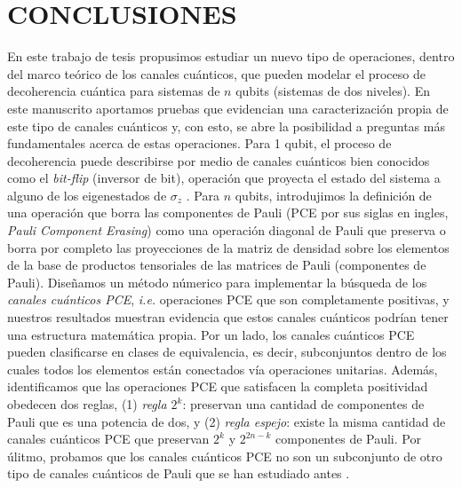 

\chapter{CONCLUSIONES}
En este trabajo de tesis propusimos estudiar un nuevo tipo de operaciones, dentro
del marco teórico de los canales cuánticos, 
que pueden modelar el proceso de decoherencia cuántica para sistemas de $n$ qubits 
(sistemas de dos niveles). 
En este manuscrito aportamos pruebas que evidencian
una caracterización propia de este tipo de canales cuánticos
y, con esto, se abre la posibilidad a preguntas más fundamentales acerca de estas 
operaciones.
Para 1 qubit, el proceso de decoherencia
puede describirse por medio de canales cuánticos bien conocidos como 
el \textit{bit-flip} (inversor de bit), operación que proyecta el estado del 
sistema a alguno de los eigenestados de $\sigma_z$
\cite{bengtsson_zyczkowski_2017,nathanson2007pauli,nielsen_chuang_2011}. 
Para $n$ qubits, 
introdujimos la definición de una operación que borra las componentes de Pauli
(PCE por sus siglas en ingles, \textit{Pauli Component Erasing}) como una 
operación diagonal de Pauli que preserva o borra por completo 
las proyecciones de la matriz de densidad sobre los elementos de la
base de productos tensoriales de las matrices de Pauli (componentes de Pauli). 
Diseñamos un método 
númerico para implementar la búsqueda de los \textit{canales cuánticos PCE},
\textit{i.e.} operaciones PCE que son completamente positivas, y nuestros 
resultados muestran evidencia que estos canales cuánticos podrían tener
una estructura matemática propia. 
Por un lado, los canales cuánticos PCE pueden clasificarse en clases de equivalencia, 
es decir, subconjuntos dentro de los cuales todos los elementos están 
conectados vía operaciones unitarias. 
Además, identificamos que las operaciones PCE 
que satisfacen la completa positividad obedecen dos reglas, (1) \textit{regla
$\mathit{2^k}$}: preservan una cantidad de componentes de Pauli
que es una potencia de dos, y (2) \textit{regla espejo}:
existe la misma cantidad de canales cuánticos PCE que preservan $2^k$ 
y $2^{2n-k}$ componentes de Pauli.
Por úlitmo, probamos que los canales cuánticos PCE no son un subconjunto
de otro tipo de canales cuánticos de Pauli que se han estudiado antes 
\cite{nathanson2007pauli}. 



